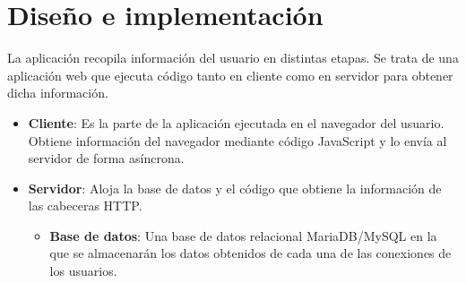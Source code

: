\chapter{Diseño e implementación}
\label{ch:diseño}
La aplicación recopila información del usuario en distintas etapas. Se trata de una aplicación web que ejecuta código tanto en cliente como en servidor para obtener dicha información.
\begin{itemize}
    \item \textbf{Cliente}: Es la parte de la aplicación ejecutada en el navegador del usuario. Obtiene información del navegador mediante código JavaScript y lo envía al servidor de forma asíncrona.
    \item \textbf{Servidor}: Aloja la base de datos y el código que obtiene la información de las cabeceras HTTP.
     \begin{itemize}
         \item \textbf{Base de datos}: Una base de datos relacional MariaDB/MySQL en la que se almacenarán los datos obtenidos de cada una de las conexiones de los usuarios.
     \end{itemize}
\end{itemize}
